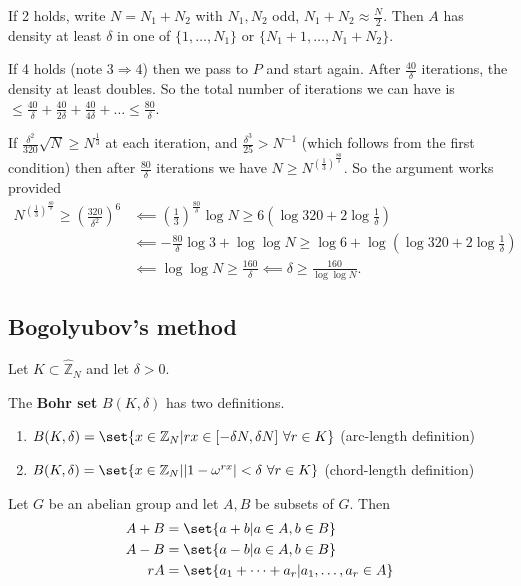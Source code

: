 \documentclass{article}
\newcommand{\1}[1]{\mathbbm{1}_{#1}}
\begin{document}
If 2 holds, write $N = N_1 + N_2$ with $N_1, N_2$ odd, $N_1 + N_2 \approx \frac{N}{2}$.
Then $A$ has density at least $\delta$ in one of $\{1,\dotsc, N_1\}$ or $\{N_1 + 1, \dotsc, N_1 + N_2\}$.

If 4 holds (note $3 \Rightarrow 4$) then we pass to $P$ and start again.
After $\frac{40}{\delta}$ iterations, the density at least doubles.
So the total number of iterations we can have is $\leq \frac{40}{\delta} + \frac{40}{2 \delta} + \frac{40}{4 \delta} + \dotsc \leq \frac{80}{\delta}$.

If $\frac{\delta^2}{320} \sqrt{N} \geq N^\frac{1}{3}$ at each iteration, and $\frac{\delta^3}{25} > N^{-1}$ (which follows from the first condition) then after $\frac{80}{\delta}$ iterations we have $N \geq N^{\left(\frac{1}{3}\right)^\frac{80}{\delta}}$.
So the argument works provided
\begin{align*}
  N^{\left(\frac{1}{3}\right)^\frac{80}{\delta}} \geq \left(\frac{320}{\delta^2}\right)^6 &\impliedby \left(\frac{1}{3}\right)^{\frac{80}{\delta}} \log N \geq 6\left(\log 320 + 2 \log \frac{1}{\delta}\right) \\
                                                                             &\impliedby - \frac{80}{\delta} \log 3 + \log \log N \geq \log 6 + \log \left(\log 320 + 2 \log \frac{1}{\delta}\right) \\
                                                                             &\impliedby \log \log N \geq \frac{160}{\delta} \impliedby \delta \geq \frac{160}{\log \log N}.
\end{align*}

\subsection{Bogolyubov's method}
Let $K \subset \hat{\mathbb{Z}}_N$ and let $\delta > 0$.
\begin{defi}
  The \textbf{Bohr set} $B(K, \delta)$ has two definitions.
  \begin{enumerate}
    \item $B(K, \delta) = \set{x \in \mathbb{Z}_N | rx \in [-\delta N, \delta N] \ \forall r \in K}$ (arc-length definition)
    \item $B(K, \delta) = \set{x \in \mathbb{Z}_N | |1 - \omega^{r x}| < \delta \ \forall r \in K}$ (chord-length definition)
  \end{enumerate}
\end{defi}
\begin{defi}
  Let $G$ be an abelian group and let $A,B$ be subsets of $G$. Then
  \begin{align*}
    A + B &= \set{a + b | a \in A, b \in B} \\
    A - B &= \set{a - b | a \in A, b \in B} \\
    rA &= \set{a_1 + \dotsb + a_r | a_1, \dotsc, a_r \in A}
  \end{align*}
\end{defi}
\end{document}
